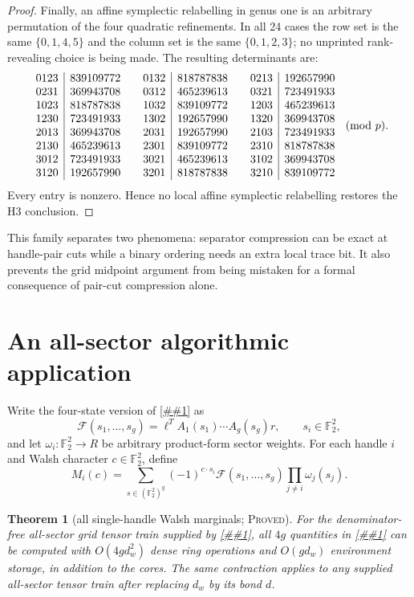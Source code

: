 \documentclass[11pt]{article}
\newcommand{\cref}[1]{\autoref{##1}}%
\newtheorem{theorem}{Theorem}[section]
\newcommand{\Ftwo}{\mathbb F_2}
\newcommand{\cF}{\mathcal F}
\newcommand{\claimtag}[1]{\textsc{#1}}
\newcommand{\proved}{\claimtag{Proved}}
\begin{document}
\begin{proof}
Finally, an affine symplectic relabelling in genus one is an arbitrary
permutation of the four quadratic refinements.  In all 24 cases the row set
is the same \(\{0,1,4,5\}\) and the column set is the same
\(\{0,1,2,3\}\); no unprinted rank-revealing choice is being made.  The
resulting determinants are:
\[
\begin{array}{c|r@{\qquad}c|r@{\qquad}c|r}
0123&839109772&0132&818787838&0213&192657990\\
0231&369943708&0312&465239613&0321&723491933\\
1023&818787838&1032&839109772&1203&465239613\\
1230&723491933&1302&192657990&1320&369943708\\
2013&369943708&2031&192657990&2103&723491933\\
2130&465239613&2301&839109772&2310&818787838\\
3012&723491933&3021&465239613&3102&369943708\\
3120&192657990&3201&818787838&3210&839109772
\end{array}\pmod p .
\]
Every entry is nonzero.  Hence no local affine symplectic relabelling
restores the H3 conclusion.
\end{proof}

This family separates two phenomena: separator compression can be exact at
handle-pair cuts while a binary ordering needs an extra local trace bit.  It
also prevents the grid midpoint argument from being mistaken for a formal
consequence of pair-cut compression alone.

\section{An all-sector algorithmic application}

Write the four-state version of \cref{eq:allq-mps} as
\[
 \cF(s_1,\ldots,s_g)=\ell^TA_1(s_1)\cdots A_g(s_g)r,
 \qquad s_i\in\Ftwo^2,
\]
and let \(\omega_i:\Ftwo^2\to R\) be arbitrary product-form sector weights.
For each handle \(i\) and Walsh character \(c\in\Ftwo^2\), define
\begin{equation}\label{eq:marginal}
 M_i(c)=\sum_{s\in(\Ftwo^2)^g}
   (-1)^{c\cdot s_i}\cF(s_1,\ldots,s_g)
   \prod_{j\ne i}\omega_j(s_j).
\end{equation}

\begin{theorem}[all single-handle Walsh marginals; \proved]
\label{thm:marginals}
For the denominator-free all-sector grid tensor train supplied by
\cref{thm:grid-upper}, all \(4g\) quantities in \cref{eq:marginal} can be
computed with \(O(4gd_w^2)\) dense ring operations and \(O(gd_w)\)
environment storage, in addition to the cores.  The same contraction applies
to any supplied all-sector tensor train after replacing \(d_w\) by its bond
\(d\).
\end{theorem}
\end{document}
